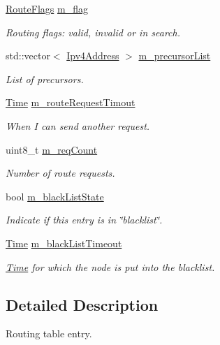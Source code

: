 \begin{DoxyCompactItemize}
\hyperlink{group__aodv_ga44216921a9c725a5ab8bc19059052a26}{Route\+Flags} \hyperlink{classns3_1_1aodv_1_1RoutingTableEntry_ae8b0a48e515e40658c7f2f2e8e808e05}{m\+\_\+flag}
\begin{DoxyCompactList}\small\item\em Routing flags\+: valid, invalid or in search. \end{DoxyCompactList}\item 
std\+::vector$<$ \hyperlink{classns3_1_1Ipv4Address}{Ipv4\+Address} $>$ \hyperlink{classns3_1_1aodv_1_1RoutingTableEntry_a1bd922e14e533615b638fb848b700ec8}{m\+\_\+precursor\+List}
\begin{DoxyCompactList}\small\item\em List of precursors. \end{DoxyCompactList}\item 
\hyperlink{classns3_1_1Time}{Time} \hyperlink{classns3_1_1aodv_1_1RoutingTableEntry_a8089a53433b9852f1593e466e3e40b25}{m\+\_\+route\+Request\+Timout}
\begin{DoxyCompactList}\small\item\em When I can send another request. \end{DoxyCompactList}\item 
uint8\+\_\+t \hyperlink{classns3_1_1aodv_1_1RoutingTableEntry_af21ed22c0223a8c24731b9de3dd654e9}{m\+\_\+req\+Count}
\begin{DoxyCompactList}\small\item\em Number of route requests. \end{DoxyCompactList}\item 
bool \hyperlink{classns3_1_1aodv_1_1RoutingTableEntry_a24aedb332d479344f3e53f8c084c2530}{m\+\_\+black\+List\+State}
\begin{DoxyCompactList}\small\item\em Indicate if this entry is in \char`\"{}blacklist\char`\"{}. \end{DoxyCompactList}\item 
\hyperlink{classns3_1_1Time}{Time} \hyperlink{classns3_1_1aodv_1_1RoutingTableEntry_ae67edae13b53dd87f8f36adebb867703}{m\+\_\+black\+List\+Timeout}
\begin{DoxyCompactList}\small\item\em \hyperlink{classns3_1_1Time}{Time} for which the node is put into the blacklist. \end{DoxyCompactList}\end{DoxyCompactItemize}


\subsection{Detailed Description}
Routing table entry. 

